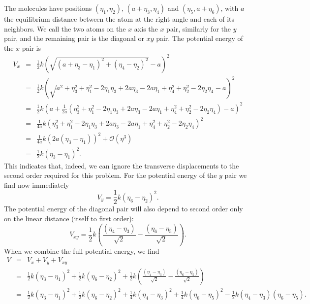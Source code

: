 \documentclass[letterpaper,11pt]{article}
\begin{document}
The molecules have positions $(\eta_1,\eta_2)$, $(a+\eta_3,\eta_4)$ and $(\eta_5,a+\eta_6)$, with $a$ the equilibrium distance between the atom at the right angle and each of its neighbors.  We call the two atoms on the $x$ axis the $x$ pair, similarly for the $y$ pair, and the remaining pair is the diagonal or $xy$ pair.  The potential energy of the $x$ pair is
\begin{eqnarray*}
 V_x & = & \frac{1}{2} k \left( \sqrt{(a + \eta_3 - \eta_1)^2 + (\eta_4 - \eta_2)^2}  - a\right)^2 \\
   & = & \frac{1}{2} k \left( \sqrt{a^2 + \eta_3^2 + \eta_1^2 - 2\eta_1\eta_3 + 2 a \eta_3 - 2 a \eta_1 + \eta_4^2 + \eta_2^2 - 2 \eta_2 \eta_4} - a \right)^2 \\
   & = & \frac{1}{2} k \left( a + \frac{1}{2a} \left( \eta_3^2 + \eta_1^2 - 2 \eta_1 \eta_3 + 2 a \eta_3 - 2 a \eta_1 + \eta_4^2 + \eta_2^2 - 2 \eta_2 \eta_4 \right) - a\right)^2 \\
   & = & \frac{1}{4a} k \left( \eta_3^2 + \eta_1^2 - 2 \eta_1 \eta_3 + 2 a \eta_3 - 2 a \eta_1 + \eta_4^2 + \eta_2^2 - 2 \eta_2 \eta_4 \right)^2 \\
   & = & \frac{1}{4a} k \left( 2 a (\eta_3 - \eta_1) \right)^2 + \mathcal{O}(\eta^3) \\
   & = & \frac{1}{2} k (\eta_3 - \eta_1)^2.
\end{eqnarray*}
This indicates that, indeed, we can ignore the transverse displacements to the second order required for this problem.  For the potential energy of the $y$ pair we find now immediately
\begin{equation*}
 V_y = \frac{1}{2} k (\eta_6 - \eta_2)^2.
\end{equation*}
The potential energy of the diagonal pair will also depend to second order only on the linear distance (itself to first order):
\begin{equation*}
 V_{xy} = \frac{1}{2} k \left( \frac{(\eta_4 - \eta_3)}{\sqrt{2}} - \frac{(\eta_6 - \eta_5)}{\sqrt{2}} \right).
\end{equation*}
When we combine the full potential energy, we find
\begin{eqnarray*}
 V & = & V_x + V_y + V_{xy} \\
 & = & \frac{1}{2} k (\eta_3 - \eta_1)^2 + \frac{1}{2} k (\eta_6 - \eta_2)^2 + \frac{1}{2} k \left( \frac{(\eta_4 - \eta_3)}{\sqrt{2}} - \frac{(\eta_6 - \eta_5)}{\sqrt{2}} \right) \\
 & = & \frac{1}{2} k (\eta_3 - \eta_1)^2 + \frac{1}{2} k (\eta_6 - \eta_2)^2 + \frac{1}{4} k (\eta_4 - \eta_3)^2 + \frac{1}{4} k (\eta_6 - \eta_5)^2 - \frac{1}{2} k (\eta_4 - \eta_3) (\eta_6 - \eta_5).
\end{eqnarray*}
\end{document}
